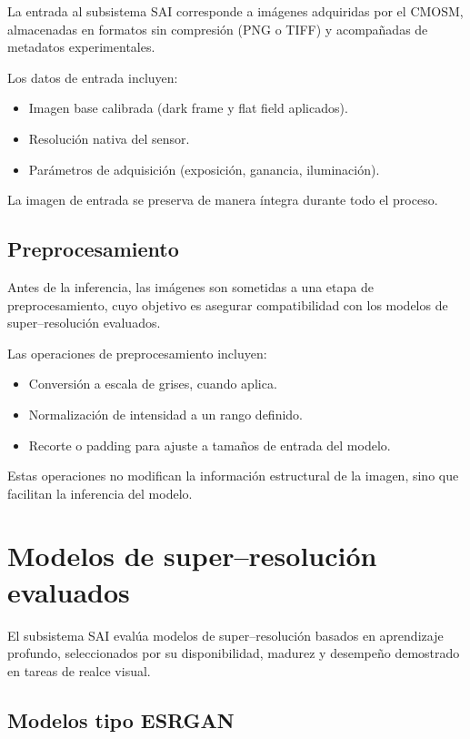 La entrada al subsistema SAI corresponde a imágenes adquiridas por el CMOSM,
almacenadas en formatos sin compresión (PNG o TIFF) y acompañadas de metadatos
experimentales.

Los datos de entrada incluyen:
\begin{itemize}
    \item Imagen base calibrada (dark frame y flat field aplicados).
    \item Resolución nativa del sensor.
    \item Parámetros de adquisición (exposición, ganancia, iluminación).
\end{itemize}

La imagen de entrada se preserva de manera íntegra durante todo el proceso.

\subsection{Preprocesamiento}

Antes de la inferencia, las imágenes son sometidas a una etapa de
preprocesamiento, cuyo objetivo es asegurar compatibilidad con los modelos de
super--resolución evaluados.

Las operaciones de preprocesamiento incluyen:
\begin{itemize}
    \item Conversión a escala de grises, cuando aplica.
    \item Normalización de intensidad a un rango definido.
    \item Recorte o padding para ajuste a tamaños de entrada del modelo.
\end{itemize}

Estas operaciones no modifican la información estructural de la imagen, sino que
facilitan la inferencia del modelo.

\section{Modelos de super--resolución evaluados}

El subsistema SAI evalúa modelos de super--resolución basados en aprendizaje
profundo, seleccionados por su disponibilidad, madurez y desempeño demostrado
en tareas de realce visual.

\subsection{Modelos tipo ESRGAN}

